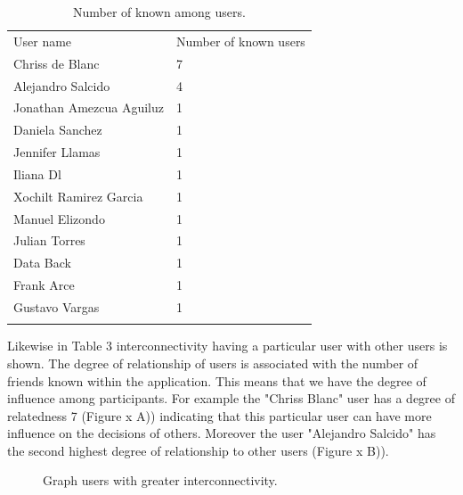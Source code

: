 \begin{table}
\small
\caption{Number of known among users.}
\label{tab:knownUsers_1} 
\centering
\small
\begin{tabular}{p{3cm} p{3cm}  }
\hline\noalign{\smallskip}
 User name & Number of known users \\
\noalign{\smallskip}\hline\noalign{\smallskip}
\small{Chriss de Blanc } & \small{7}  \\ \hline 
\small{Alejandro Salcido } & \small{4}  \\ \hline
\small{Jonathan Amezcua Aguiluz } & \small{1}  \\ \hline
\small{Daniela Sanchez } & \small{1}  \\ \hline
\small{Jennifer Llamas} & \small{1}  \\ \hline
\small{Iliana Dl } & \small{1}  \\ \hline
\small{Xochilt Ramirez Garcia } & \small{1}  \\ \hline
\small{Manuel Elizondo } & \small{1}  \\ \hline 
\small{Julian Torres } & \small{1}  \\ \hline 
\small{Data Back } & \small{1}  \\ \hline 
\small{Frank Arce } & \small{1}  \\ \hline 
\small{Gustavo Vargas } & \small{1}  \\ \hline 
\noalign{\smallskip}\hline
\end{tabular}
\end{table}

Likewise in Table 3 interconnectivity having a particular user with other users
is shown. The degree of relationship of users is associated with the number of
friends known within the application. This means that we have the degree of
influence among participants. For example the "Chriss Blanc" user has a degree
of relatedness 7 (Figure x A)) indicating that this particular user can have
more influence on the decisions of others. Moreover the user "Alejandro Salcido"
has the second highest degree of relationship to other users (Figure x B)).

\begin{figure}
\centering
{} %
\caption{Graph users with greater interconnectivity.}
\label{fig:guserknown_1}   
\end{figure}

